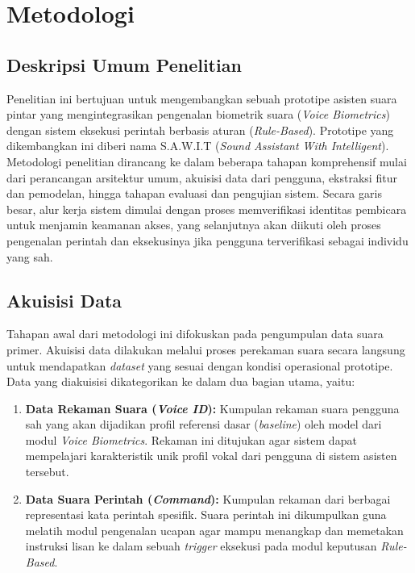 \chapter{Metodologi}

\section{Deskripsi Umum Penelitian}
Penelitian ini bertujuan untuk mengembangkan sebuah prototipe asisten suara pintar yang mengintegrasikan pengenalan biometrik suara (\textit{Voice Biometrics}) dengan sistem eksekusi perintah berbasis aturan (\textit{Rule-Based}). Prototipe yang dikembangkan ini diberi nama S.A.W.I.T (\textit{Sound Assistant With Intelligent}). Metodologi penelitian dirancang ke dalam beberapa tahapan komprehensif mulai dari perancangan arsitektur umum, akuisisi data dari pengguna, ekstraksi fitur dan pemodelan, hingga tahapan evaluasi dan pengujian sistem. Secara garis besar, alur kerja sistem dimulai dengan proses memverifikasi identitas pembicara untuk menjamin keamanan akses, yang selanjutnya akan diikuti oleh proses pengenalan perintah dan eksekusinya jika pengguna terverifikasi sebagai individu yang sah.

\section{Akuisisi Data}
Tahapan awal dari metodologi ini difokuskan pada pengumpulan data suara primer. Akuisisi data dilakukan melalui proses perekaman suara secara langsung untuk mendapatkan \textit{dataset} yang sesuai dengan kondisi operasional prototipe. Data yang diakuisisi dikategorikan ke dalam dua bagian utama, yaitu:
\begin{enumerate}
    \item \textbf{Data Rekaman Suara (\textit{Voice ID}):} Kumpulan rekaman suara pengguna sah yang akan dijadikan profil referensi dasar (\textit{baseline}) oleh model dari modul \textit{Voice Biometrics}. Rekaman ini ditujukan agar sistem dapat mempelajari karakteristik unik profil vokal dari pengguna di sistem asisten tersebut.
    \item \textbf{Data Suara Perintah (\textit{Command}):} Kumpulan rekaman dari berbagai representasi kata perintah spesifik. Suara perintah ini dikumpulkan guna melatih modul pengenalan ucapan agar mampu menangkap dan memetakan instruksi lisan ke dalam sebuah \textit{trigger} eksekusi pada modul keputusan \textit{Rule-Based}.
\end{enumerate}

